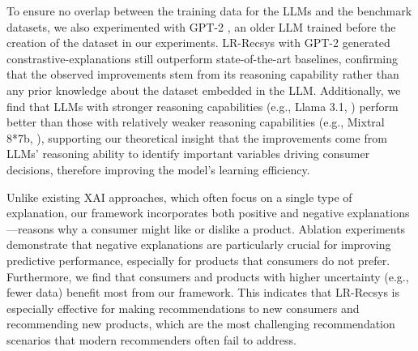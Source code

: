 To ensure no overlap between the training data for the LLMs and the benchmark datasets, we also experimented with GPT-2 \citep{radford2019language}, an older LLM trained before the creation of the dataset in our experiments. LR-Recsys with GPT-2 generated constrastive-explanations still outperform state-of-the-art baselines, confirming that the observed improvements stem from its reasoning capability rather than any prior knowledge about the dataset embedded in the LLM. Additionally, we find that LLMs with stronger reasoning capabilities (e.g., Llama 3.1, \citep{meta2024introducing}) perform better than those with relatively weaker reasoning capabilities (e.g., Mixtral 8*7b, \citep{jiang2024mixtral}), supporting our theoretical insight that the improvements come from LLMs’ reasoning ability to identify important variables driving consumer decisions, therefore improving the model's learning efficiency.

Unlike existing XAI approaches, which often focus on a single type of explanation, our framework incorporates both positive and negative explanations—reasons why a consumer might like or dislike a product. Ablation experiments demonstrate that negative explanations are particularly crucial for improving predictive performance, especially for products that consumers do not prefer. Furthermore, we find that consumers and products with higher uncertainty (e.g., fewer data) benefit most from our framework. This indicates that LR-Recsys is especially effective for making recommendations to new consumers and recommending new products, which are the most challenging recommendation scenarios that modern recommenders often fail to address. %





